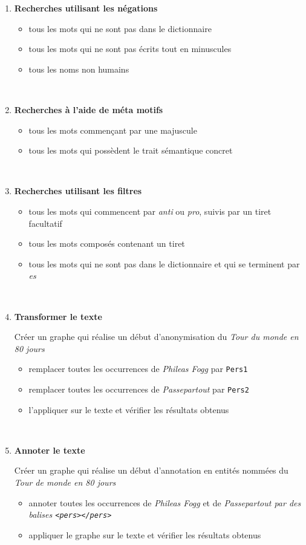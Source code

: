\documentclass[xcolor={table,usenames,dvipsnames}]{article}
\begin{document}
\begin{enumerate}
\item \textbf{Recherches utilisant les négations}
\begin{itemize}
\item tous les mots qui ne sont pas dans le dictionnaire
\item tous les mots qui ne sont pas écrits tout en minuscules
\item tous les noms non humains
\end{itemize}
	\\
\bigskip

\item \textbf{Recherches à l'aide de méta motifs}
\begin{itemize}
	\item tous les mots commençant par une majuscule
	\item tous les mots qui possèdent le trait sémantique \og{}concret\fg{}
\end{itemize}
\\
\bigskip

\item \textbf{Recherches utilisant les filtres}
\begin{itemize}
	\item tous les mots qui commencent par \textit{anti} ou \textit{pro}, suivis par un tiret facultatif
	\item tous les mots composés contenant un tiret
	\item tous les mots qui ne sont pas dans le dictionnaire et qui se terminent par \textit{es}
\end{itemize}
\\
\bigskip
\item \textbf{Transformer le texte}

Créer un graphe qui réalise un début d'anonymisation du \textit{Tour du monde en 80 jours}
	\begin{itemize}
	\item remplacer toutes les occurrences de \textit{Phileas Fogg} par \texttt{Pers1}
	\item remplacer toutes les occurrences de \textit{Passepartout} par \texttt{Pers2}
	\item l'appliquer sur le texte et vérifier les résultats obtenus
\end{itemize}

\\
\bigskip


\item \textbf{Annoter le texte}

Créer un graphe qui réalise un début d'annotation en entités nommées du \textit{Tour de monde en 80 jours}
	\begin{itemize}
	\item annoter toutes les occurrences de \textit{Phileas Fogg} et de \textit{Passepartout par des balises \texttt{<pers></pers>}}
	\item appliquer le graphe sur le texte et vérifier les résultats obtenus
\end{itemize}
\end{enumerate}
\end{document}
